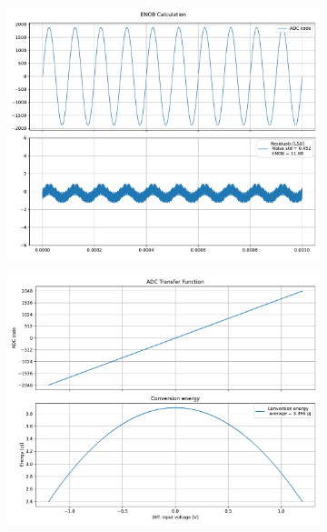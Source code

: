 \documentclass[varwidth]{standalone}
\begin{document}
\begin{figure}
\begin{subfigure}{0.32\textwidth}
    \includegraphics[width=\textwidth]{12b_caeleste_enob.pdf}
\end{subfigure}
\begin{subfigure}{0.32\textwidth}
    \begin{table}
    \let\center\empty
    \let\endcenter\relax
    \centering
    \resizebox{0.3\width}{!}{}
    \end{table}
    \includegraphics[width=\textwidth]{12b_caeleste_energy.pdf}
\end{subfigure}
\end{figure}
\end{document}
